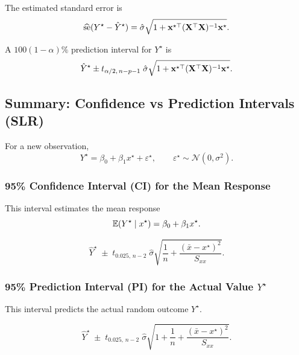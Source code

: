 The estimated standard error is
\[
\widehat{\mathrm{se}}(Y^\star - \hat{Y}^\star)
=
\hat{\sigma}
\sqrt{
1 +
\mathbf{x}^{\star\top}
(\mathbf{X}^\top \mathbf{X})^{-1}
\mathbf{x}^\star
}.
\]

\begin{keyresult}
A $100(1-\alpha)\%$ prediction interval for $Y^\star$ is
\[
\hat{Y}^\star
\pm
t_{\alpha/2,\,n-p-1}
\;
\hat{\sigma}
\sqrt{
1 +
\mathbf{x}^{\star\top}
(\mathbf{X}^\top \mathbf{X})^{-1}
\mathbf{x}^\star
}.
\]
\end{keyresult}

\clearpage

\subsection{Summary: Confidence vs Prediction Intervals (SLR)}

For a new observation,
\[
Y^\star = \beta_0 + \beta_1 x^\star + \varepsilon^\star,
\qquad
\varepsilon^\star \sim \mathcal{N}(0,\sigma^2).
\]

\subsubsection{95\% Confidence Interval (CI) for the Mean Response}

This interval estimates the mean response
\[
\mathbb{E}(Y^\star \mid x^\star) = \beta_0 + \beta_1 x^\star.
\]

\[
\hat{Y}^\star
\;\pm\;
t_{0.025,\,n-2}\;
\hat{\sigma}
\sqrt{
\frac{1}{n}
+
\frac{(\bar{x} - x^\star)^2}{S_{xx}}
}.
\]

\subsubsection{95\% Prediction Interval (PI) for the Actual Value $Y^\star$}

This interval predicts the actual random outcome $Y^\star$.

\[
\hat{Y}^\star
\;\pm\;
t_{0.025,\,n-2}\;
\hat{\sigma}
\sqrt{
\boxed{1}
+
\frac{1}{n}
+
\frac{(\bar{x} - x^\star)^2}{S_{xx}}
}.
\]

\clearpage
